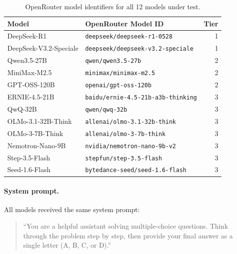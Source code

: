 \begin{table}[H]
  \centering
  \caption{OpenRouter model identifiers for all 12 models under test.}
  \label{tab:model_ids}
  \small
  \begin{tabular}{llr}
    \toprule
    \textbf{Model} & \textbf{OpenRouter Model ID} & \textbf{Tier} \\
    \midrule
    DeepSeek-R1           & \texttt{deepseek/deepseek-r1-0528}            & 1 \\
    DeepSeek-V3.2-Speciale & \texttt{deepseek/deepseek-v3.2-speciale}     & 1 \\
    \midrule
    Qwen3.5-27B           & \texttt{qwen/qwen3.5-27b}                     & 2 \\
    MiniMax-M2.5          & \texttt{minimax/minimax-m2.5}                  & 2 \\
    GPT-OSS-120B          & \texttt{openai/gpt-oss-120b}                   & 2 \\
    \midrule
    ERNIE-4.5-21B         & \texttt{baidu/ernie-4.5-21b-a3b-thinking}      & 3 \\
    QwQ-32B               & \texttt{qwen/qwq-32b}                          & 3 \\
    OLMo-3.1-32B-Think    & \texttt{allenai/olmo-3.1-32b-think}            & 3 \\
    OLMo-3-7B-Think       & \texttt{allenai/olmo-3-7b-think}               & 3 \\
    Nemotron-Nano-9B      & \texttt{nvidia/nemotron-nano-9b-v2}            & 3 \\
    Step-3.5-Flash        & \texttt{stepfun/step-3.5-flash}                & 3 \\
    Seed-1.6-Flash        & \texttt{bytedance-seed/seed-1.6-flash}         & 3 \\
    \bottomrule
  \end{tabular}
\end{table}

\paragraph{System prompt.} All models received the same system prompt:
\begin{quote}
``You are a helpful assistant solving multiple-choice questions. Think through the problem step by step, then provide your final answer as a single letter (A, B, C, or D).''
\end{quote}
